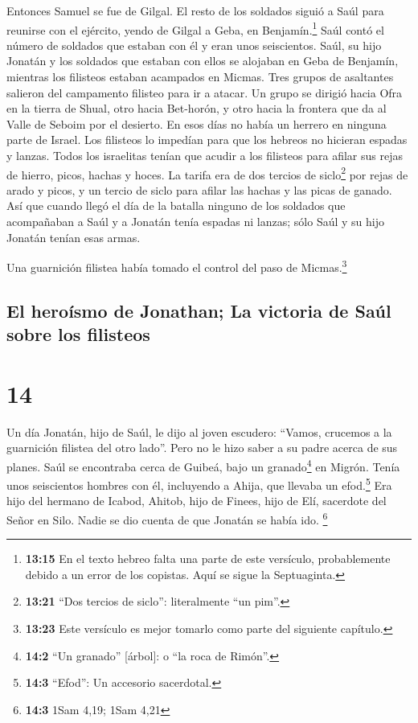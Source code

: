  Entonces Samuel se fue de Gilgal. El resto de los
soldados siguió a Saúl para reunirse con el ejército, yendo de Gilgal a
Geba, en Benjamín.\footnote{\textbf{13:15} En el texto hebreo falta una
  parte de este versículo, probablemente debido a un error de los
  copistas. Aquí se sigue la Septuaginta.} Saúl contó el número de
soldados que estaban con él y eran unos seiscientos. 
Saúl, su hijo Jonatán y los soldados que estaban con ellos se alojaban
en Geba de Benjamín, mientras los filisteos estaban acampados en Micmas.
 Tres grupos de asaltantes salieron del campamento
filisteo para ir a atacar. Un grupo se dirigió hacia Ofra en la tierra
de Shual,  otro hacia Bet-horón, y otro hacia la frontera
que da al Valle de Seboim por el desierto.  En esos días
no había un herrero en ninguna parte de Israel. Los filisteos lo
impedían para que los hebreos no hicieran espadas y lanzas.
 Todos los israelitas tenían que acudir a los filisteos
para afilar sus rejas de hierro, picos, hachas y hoces. 
La tarifa era de dos tercios de siclo\footnote{\textbf{13:21} ``Dos
  tercios de siclo'': literalmente ``un pim''.} por rejas de arado y
picos, y un tercio de siclo para afilar las hachas y las picas de
ganado.  Así que cuando llegó el día de la batalla
ninguno de los soldados que acompañaban a Saúl y a Jonatán tenía espadas
ni lanzas; sólo Saúl y su hijo Jonatán tenían esas armas.

 Una guarnición filistea había tomado el control del paso
de Micmas.\footnote{\textbf{13:23} Este versículo es mejor tomarlo como
  parte del siguiente capítulo.}

\hypertarget{el-herouxedsmo-de-jonathan-la-victoria-de-sauxfal-sobre-los-filisteos}{%
\subsection{El heroísmo de Jonathan; La victoria de Saúl sobre los
filisteos}\label{el-herouxedsmo-de-jonathan-la-victoria-de-sauxfal-sobre-los-filisteos}}

\hypertarget{section-13}{%
\section{14}\label{section-13}}

 Un día Jonatán, hijo de Saúl, le dijo al joven escudero:
``Vamos, crucemos a la guarnición filistea del otro lado''. Pero no le
hizo saber a su padre acerca de sus planes.  Saúl se
encontraba cerca de Guibeá, bajo un granado\footnote{\textbf{14:2} ``Un
  granado'' {[}árbol{]}: o ``la roca de Rimón''.} en Migrón. Tenía unos
seiscientos hombres con él,  incluyendo a Ahija, que
llevaba un efod.\footnote{\textbf{14:3} ``Efod'': Un accesorio
  sacerdotal.} Era hijo del hermano de Icabod, Ahitob, hijo de Finees,
hijo de Elí, sacerdote del Señor en Silo. Nadie se dio cuenta de que
Jonatán se había ido. \footnote{\textbf{14:3} 1Sam 4,19; 1Sam 4,21}

